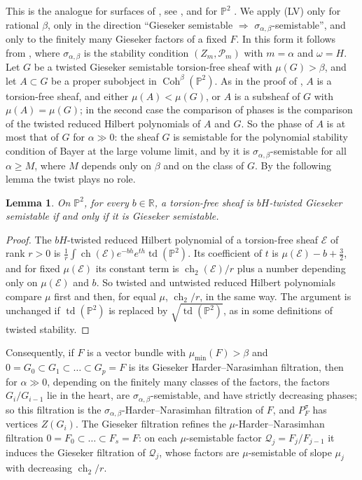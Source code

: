 \documentclass[11pt]{amsart}
\newtheorem{lemma}[theorem]{Lemma}
\theoremstyle{definition}
\theoremstyle{remark}
\newcommand{\PP}{\mathbb{P}}
\newcommand{\RR}{\mathbb{R}}
\newcommand{\cE}{\mathcal{E}}
\newcommand{\cQ}{\mathcal{Q}}
\begin{document}
\smallskip\noindent This is the analogue for surfaces of \cite[Prop.~14.2]{Br08}, see \cite[\S6, Exercise~6.27]{MS17}, and for $\PP^2$ \cite[\S6]{ABCH13}. We apply (LV) only for rational $\beta$, only in the direction ``Gieseker semistable $\Rightarrow$ $\sigma_{\alpha,\beta}$-semistable'', and only to the finitely many Gieseker factors of a fixed $F$. In this form it follows from \cite{LQ14}, where $\sigma_{\alpha,\beta}$ is the stability condition $(Z_m,\mathcal P_m)$ with $m=\alpha$ and $\omega=H$. Let $G$ be a twisted Gieseker semistable torsion-free sheaf with $\mu(G)>\beta$, and let $A\subset G$ be a proper subobject in $\operatorname{Coh}^\beta(\PP^2)$. As in the proof of \cite[Lemma~5.1]{LQ14}, $A$ is a torsion-free sheaf, and either $\mu(A)<\mu(G)$, or $A$ is a subsheaf of $G$ with $\mu(A)=\mu(G)$; in the second case the comparison of phases \cite[(2.7)]{LQ14} is the comparison of the twisted reduced Hilbert polynomials of $A$ and $G$. So the phase of $A$ is at most that of $G$ for $\alpha\gg0$: the sheaf $G$ is semistable for the polynomial stability condition of Bayer \cite{Bay09} at the large volume limit, and by \cite[Lemma~4.3]{LQ14} it is $\sigma_{\alpha,\beta}$-semistable for all $\alpha\ge M$, where $M$ depends only on $\beta$ and on the class of $G$. By the following lemma the twist plays no role.

\begin{lemma}\label{lem:twist}
On $\PP^2$, for every $b\in\RR$, a torsion-free sheaf is $bH$-twisted Gieseker semistable if and only if it is Gieseker semistable.
\end{lemma}

\begin{proof}
The $bH$-twisted reduced Hilbert polynomial of a torsion-free sheaf $\cE$ of rank $r>0$ is $\frac1r\int\operatorname{ch}(\cE)e^{-bh}e^{th}\operatorname{td}(\PP^2)$. Its coefficient of $t$ is $\mu(\cE)-b+\frac32$, and for fixed $\mu(\cE)$ its constant term is $\operatorname{ch}_2(\cE)/r$ plus a number depending only on $\mu(\cE)$ and $b$. So twisted and untwisted reduced Hilbert polynomials compare $\mu$ first and then, for equal $\mu$, $\operatorname{ch}_2/r$, in the same way. The argument is unchanged if $\operatorname{td}(\PP^2)$ is replaced by $\sqrt{\operatorname{td}(\PP^2)}$, as in some definitions of twisted stability.
\end{proof}

Consequently, if $F$ is a vector bundle with $\mu_{\min}(F)>\beta$ and $0=G_0\subset G_1\subset\dots\subset G_p=F$ is its Gieseker Harder--Narasimhan filtration, then for $\alpha\gg0$, depending on the finitely many classes of the factors, the factors $G_i/G_{i-1}$ lie in the heart, are $\sigma_{\alpha,\beta}$-semistable, and have strictly decreasing phases; so this filtration is the $\sigma_{\alpha,\beta}$-Harder--Narasimhan filtration of $F$, and $P^\sigma_F$ has vertices $Z(G_i)$. The Gieseker filtration refines the $\mu$-Harder--Narasimhan filtration $0=F_0\subset\dots\subset F_s=F$: on each $\mu$-semistable factor $\cQ_j=F_j/F_{j-1}$ it induces the Gieseker filtration of $\cQ_j$, whose factors are $\mu$-semistable of slope $\mu_j$ with decreasing $\operatorname{ch}_2/r$.
\end{document}
